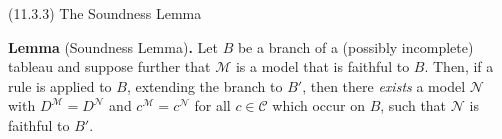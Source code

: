 \documentclass[../slides.tex]{subfiles}
\begin{document}
\begin{frame}{(11.3.3) The Soundness Lemma}

\textbf{Lemma} (Soundness Lemma)\textbf{.} Let $B$ be a branch of a (possibly incomplete)
                      tableau and suppose further that $\mathcal{M}$
                      is a model that is faithful to $B$. Then, if a
                      rule is applied to $B$, extending the branch to
                      $B'$, then there \emph{exists} a model
                      $\mathcal{N}$ with
                      $D^\mathcal{M}=D^\mathcal{N}$ and
                      $c^\mathcal{M}=c^\mathcal{N}$ for all
                      $c\in\mathcal{C}$ which occur on $B$, such that
                      $\mathcal{N}$ is faithful to $B'$.
      
  
\end{frame}
\end{document}
